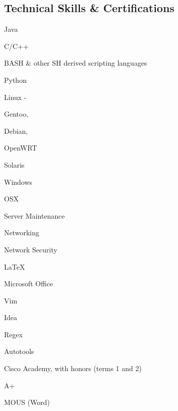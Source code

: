 \documentclass[a4paper,margin,line]{resume}
\begin{document}
\begin{resume}
\section{\mysidestyle Technical Skills \& Certifications}
	\begin{compactdesc}
		\item[Languages] \begin{inparaenum} { \small
			\item Java
			\item C/C++
			\item BASH \& other SH derived scripting languages
			\item Python
		} \end{inparaenum}
		\item[Operating Systems] \begin{inparaenum} { \small
			\item Linux -
			\begin{inparablank}
				\item Gentoo,
				\item Debian,
				\item OpenWRT
			\end{inparablank}
			\item Solaris
			\item Windows
			\item OSX
		} \end{inparaenum}
		\item[Hardware] \begin{inparaenum} { \small
			\item Server Maintenance
			\item Networking
			\item Network Security
		} \end{inparaenum}
		\item[Tools] \begin{inparaenum} { \small
			\item \LaTeX
			\item Microsoft Office
			\item Vim
			\item Idea
			\item Regex
			\item Autotools
		} \end{inparaenum}
		\item[Certifications] \begin{inparaenum} { \small
			\item Cisco Academy, with honors (terms 1 and 2)
			\item A+
			\item MOUS (Word)
		} \end{inparaenum}
	\end{compactdesc}


\end{resume}
\end{document}
